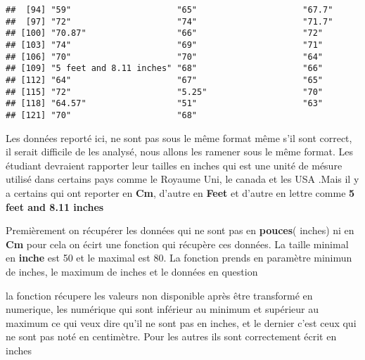 \documentclass[
]{article}
\begin{document}
\begin{verbatim}
##  [94] "59"                     "65"                     "67.7"                  
##  [97] "72"                     "74"                     "71.7"                  
## [100] "70.87"                  "66"                     "72"                    
## [103] "74"                     "69"                     "71"                    
## [106] "70"                     "70"                     "64"                    
## [109] "5 feet and 8.11 inches" "68"                     "66"                    
## [112] "64"                     "67"                     "65"                    
## [115] "72"                     "5.25"                   "70"                    
## [118] "64.57"                  "51"                     "63"                    
## [121] "70"                     "68"
\end{verbatim}

Les données reporté ici, ne sont pas sous le même format même s'il sont
correct, il serait difficile de les analysé, nous allons les ramener
sous le même format. Les étudiant devraient rapporter leur tailles en
inches qui est une unité de mésure utilisé dans certains pays comme le
Royaume Uni, le canada et les USA .Mais il y a certains qui ont reporter
en \textbf{Cm}, d'autre en \textbf{Feet} et d'autre en lettre comme
\textbf{5 feet and 8.11 inches}

Premièrement on récupérer les données qui ne sont pas en
\textbf{pouces}( inches) ni en \textbf{Cm} pour cela on écirt une
fonction qui récupère ces données. La taille minimal en \textbf{inche}
est 50 et le maximal est 80. La fonction prends en paramètre minimun de
inches, le maximum de inches et le données en question

la fonction récupere les valeurs non disponible après être transformé en
numerique, les numérique qui sont inférieur au minimum et supérieur au
maximum ce qui veux dire qu'il ne sont pas en inches, et le dernier
c'est ceux qui ne sont pas noté en centimètre. Pour les autres ils sont
correctement écrit en inches
\end{document}

